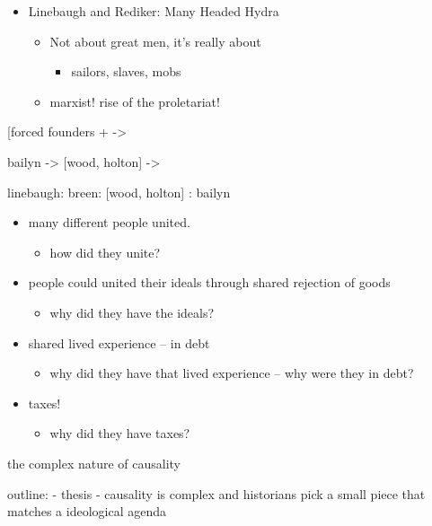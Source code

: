 \documentclass[letterpaper]{article}
\begin{document}
\begin{itemize}
\begin{itemize}
\item Linebaugh and Rediker: Many Headed Hydra

\begin{itemize}
\item Not about great men, it's really about

\begin{itemize}
\item sailors, slaves, mobs
\end{itemize}

\item marxist! rise of the proletariat!
\end{itemize}
\end{itemize}
\end{itemize}

[forced founders + ->

bailyn -> [wood, holton] ->

linebaugh: breen: [wood, holton] : bailyn

\begin{itemize}
\item many different people united.

\begin{itemize}
\item how did they unite?
\end{itemize}

\item people could united their ideals through shared rejection of goods

\begin{itemize}
\item why did they have the ideals?
\end{itemize}

\item shared lived experience -- in debt

\begin{itemize}
\item why did they have that lived experience -- why were they in debt?
\end{itemize}

\item taxes!

\begin{itemize}
\item why did they have taxes?
\end{itemize}
\end{itemize}

the complex nature of causality

outline: - thesis - causality is complex and historians pick a small
piece that matches a ideological agenda
\end{document}
